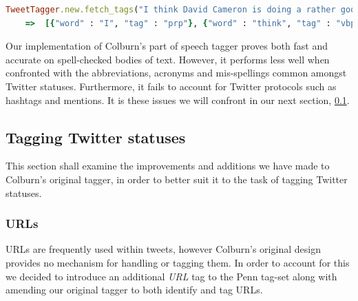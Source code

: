 \begin{lstlisting}[language=Ruby, numbers=none, caption={Returned part of speech tags for \emph{Example 1}}, label=overview:example_1_pos_json]
TweetTagger.new.fetch_tags("I think David Cameron is doing a rather good job: strong leader, holding together seemingly impossible coalition, keeping labour at bay")
	=>	[{"word" : "I", "tag" : "prp"}, {"word" : "think", "tag" : "vbp"}, {"word" : "David", "tag" : "nnp"}, {"word" : "Cameron", "tag" : "nnp"}, {"word" : "is", "tag" : "vbz"}, {"word" : "doing", "tag" : "vbg"}, {"word" : "a", "tag" : "det"}, {"word" : "rather", "tag" : "rb"}, {"word" : "good", "tag" : "jj"}, {"word" : "job", "tag" : "nn"}, {"word" : ":", "tag" : "pps"}, {"word" : "strong", "tag" : "jj"}, {"word" : "leader", "tag" : "nn"}, {"word" : ",", "tag" : "ppc"}, {"word" : "holding", "tag" : "vbg"}, {"word" : "together", "tag" : "rb"}, {"word" : "seemingly", "tag" : "rb"}, {"word" : "impossible", "tag" : "jj"}, {"word" : "coalition", "tag" : "nn"}, {"word" : ",", "tag" : "ppc"}, {"word" : "keeping", "tag" : "vbg"}, {"word" : "labour", "tag" : "nn"}, {"word" : "at", "tag" : "in"}, {"word" : "bay", "tag" : "nn"}]
\end{lstlisting}

Our implementation of Colburn's part of speech tagger proves both fast and accurate on spell-checked bodies of text. However, it performs less well when confronted with the abbreviations, acronyms and mis-spellings common amongst Twitter statuses. Furthermore, it fails to account for Twitter protocols such as hashtags and mentions. It is these issues we will confront in our next section, \ref{retrieval:statuses}.

\subsection{Tagging Twitter statuses}
\label{retrieval:statuses}

This section shall examine the improvements and additions we have made to Colburn's original tagger, in order to better suit it to the task of tagging Twitter statuses.

\subsubsection{URLs}
\label{retrieval:urls}

URLs are frequently used within tweets, however Colburn's original design provides no mechanism for handling or tagging them. In order to account for this we decided to introduce an additional \emph{URL} tag to the Penn tag-set along with amending our original tagger to both identify and tag URLs.

